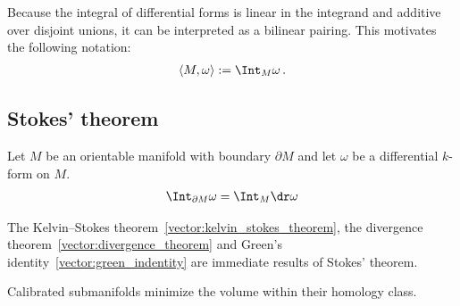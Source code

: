 
    \begin{notation}
        Because the integral of differential forms is linear in the integrand and additive over disjoint unions, it can be interpreted as a bilinear pairing. This motivates the following notation:
        \begin{gather}
            \langle M,\omega \rangle := \Int_M\omega\,.
        \end{gather}
    \end{notation}

\subsection{Stokes' theorem}

    \begin{theorem}\label{bundle:stokes_theorem}
        Let $M$ be an orientable manifold with boundary $\partial M$ and let $\omega$ be a differential $k$-form on $M$.
        \begin{gather}
            \Int_{\partial M}\omega = \Int_M\dr\omega
        \end{gather}
    \end{theorem}
    \begin{result}
        The Kelvin--Stokes theorem~\ref{vector:kelvin_stokes_theorem}, the divergence theorem~\ref{vector:divergence_theorem} and Green's identity~\ref{vector:green_indentity} are immediate results of Stokes' theorem.
    \end{result}

    \begin{property}
        Calibrated submanifolds minimize the volume within their homology class.
    \end{property}
